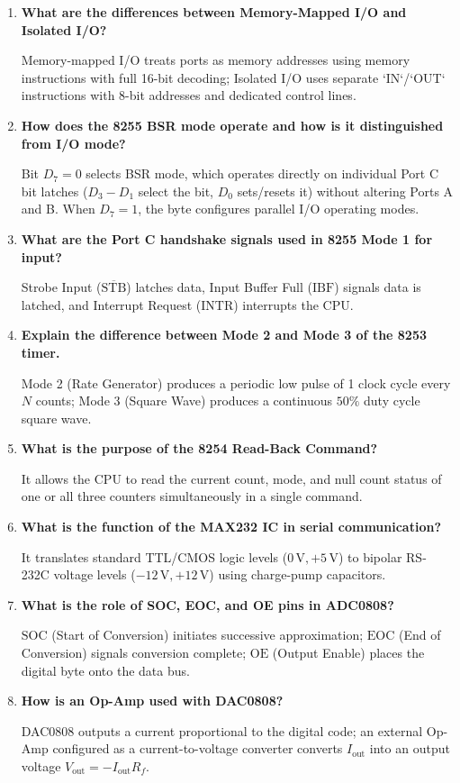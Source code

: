\documentclass[12pt,a4paper]{article}
\newcommand{\Q}[1]{\textbf{#1}\par\noindent\ignorespaces}
\begin{document}
\begin{tcolorbox}[exambox, title={Frequently Asked / Viva Questions}]
\begin{enumerate}[leftmargin=*, label=\textbf{Q\arabic*.}, itemsep=2.5pt]
  \item \Q{What are the differences between Memory-Mapped I/O and Isolated I/O?}
  Memory-mapped I/O treats ports as memory addresses using memory instructions with full 16-bit decoding; Isolated I/O uses separate `IN`/`OUT` instructions with 8-bit addresses and dedicated control lines.
  \item \Q{How does the 8255 BSR mode operate and how is it distinguished from I/O mode?}
  Bit $D_7 = 0$ selects BSR mode, which operates directly on individual Port C bit latches ($D_3-D_1$ select the bit, $D_0$ sets/resets it) without altering Ports A and B. When $D_7 = 1$, the byte configures parallel I/O operating modes.
  \item \Q{What are the Port C handshake signals used in 8255 Mode 1 for input?}
  Strobe Input ($\overline{\mathrm{STB}}$) latches data, Input Buffer Full ($\mathrm{IBF}$) signals data is latched, and Interrupt Request ($\mathrm{INTR}$) interrupts the CPU.
  \item \Q{Explain the difference between Mode 2 and Mode 3 of the 8253 timer.}
  Mode 2 (Rate Generator) produces a periodic low pulse of 1 clock cycle every $N$ counts; Mode 3 (Square Wave) produces a continuous $50\%$ duty cycle square wave.
  \item \Q{What is the purpose of the 8254 Read-Back Command?}
  It allows the CPU to read the current count, mode, and null count status of one or all three counters simultaneously in a single command.
  \item \Q{What is the function of the MAX232 IC in serial communication?}
  It translates standard TTL/CMOS logic levels ($0\,\mathrm{V}, +5\,\mathrm{V}$) to bipolar RS-232C voltage levels ($-12\,\mathrm{V}, +12\,\mathrm{V}$) using charge-pump capacitors.
  \item \Q{What is the role of SOC, EOC, and OE pins in ADC0808?}
  $\mathrm{SOC}$ (Start of Conversion) initiates successive approximation; $\mathrm{EOC}$ (End of Conversion) signals conversion complete; $\mathrm{OE}$ (Output Enable) places the digital byte onto the data bus.
  \item \Q{How is an Op-Amp used with DAC0808?}
  DAC0808 outputs a current proportional to the digital code; an external Op-Amp configured as a current-to-voltage converter converts $I_{\mathrm{out}}$ into an output voltage $V_{\mathrm{out}} = -I_{\mathrm{out}} R_f$.

\end{enumerate}
\end{tcolorbox}
\end{document}
